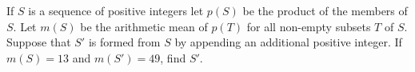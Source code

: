 If $S$ is a sequence of positive integers let $p(S)$ be the product of the members of $S$. Let $m(S)$ be the arithmetic mean of $p(T)$ for all non-empty subsets $T$ of $S$. Suppose that $S'$ is formed from $S$ by appending an additional positive integer. If $m(S) = 13$ and $m(S') = 49$,  find $S'$.